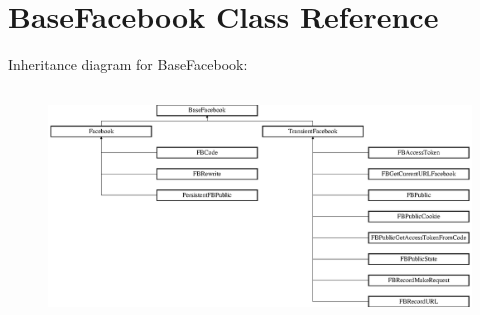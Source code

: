 \hypertarget{class_base_facebook}{\section{Base\-Facebook Class Reference}
\label{class_base_facebook}
}
Inheritance diagram for Base\-Facebook\-:\begin{figure}[H]
\begin{center}
\leavevmode
\includegraphics[height=6.222222cm]{class_base_facebook}
\end{center}
\end{figure}
